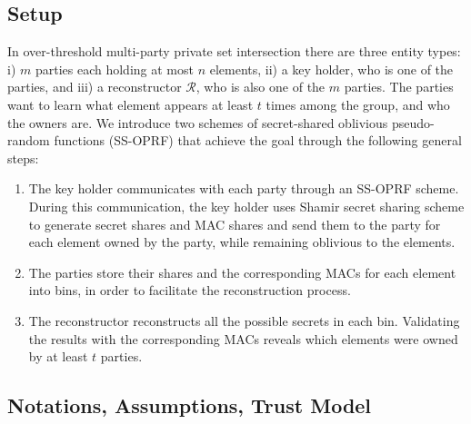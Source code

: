 \subsection{Setup}
In over-threshold multi-party private set intersection there are three entity types: i) $m$ parties each holding at most $n$ elements, ii) a key holder, who is one of the parties, and iii) a reconstructor $\mathcal{R}$, who is also one of the $m$ parties. The parties want to learn what element appears at least $t$ times among the group, and who the owners are. We introduce two schemes of secret-shared oblivious pseudo-random functions (SS-OPRF) that achieve the goal through the following general steps:
\begin{enumerate}[label=(\alph*)]
    \item The key holder communicates with each party through an SS-OPRF scheme. During this communication, the key holder uses Shamir secret sharing scheme \cite{Shamir} to generate secret shares and MAC shares and send them to the party for each element owned by the party, while remaining oblivious to the elements. 
    \item The parties store their shares and the corresponding MACs for each element into bins, in order to facilitate the reconstruction process. 
    \item The reconstructor reconstructs all the possible secrets in each bin. Validating the results with the corresponding MACs reveals which elements were owned by at least $t$ parties. 
\end{enumerate}

\subsection{Notations, Assumptions, Trust Model}
